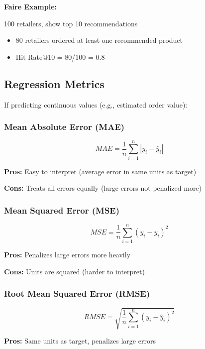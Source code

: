 \documentclass[11pt,letterpaper]{article}
\begin{document}
\textbf{Faire Example:}

100 retailers, show top 10 recommendations
\begin{itemize}
    \item 80 retailers ordered at least one recommended product
    \item Hit Rate@10 = 80/100 = 0.8
\end{itemize}

\subsection{Regression Metrics}

If predicting continuous values (e.g., estimated order value):

\subsubsection{Mean Absolute Error (MAE)}

\begin{equation}
MAE = \frac{1}{n} \sum_{i=1}^{n} |y_i - \hat{y}_i|
\end{equation}

\textbf{Pros:} Easy to interpret (average error in same units as target)

\textbf{Cons:} Treats all errors equally (large errors not penalized more)

\subsubsection{Mean Squared Error (MSE)}

\begin{equation}
MSE = \frac{1}{n} \sum_{i=1}^{n} (y_i - \hat{y}_i)^2
\end{equation}

\textbf{Pros:} Penalizes large errors more heavily

\textbf{Cons:} Units are squared (harder to interpret)

\subsubsection{Root Mean Squared Error (RMSE)}

\begin{equation}
RMSE = \sqrt{\frac{1}{n} \sum_{i=1}^{n} (y_i - \hat{y}_i)^2}
\end{equation}

\textbf{Pros:} Same units as target, penalizes large errors
\end{document}
